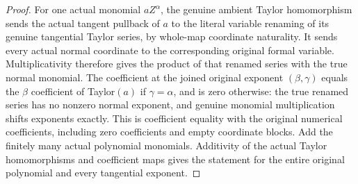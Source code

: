 \begin{proof}
For one actual monomial $a Z^\alpha$, the genuine ambient Taylor
homomorphism sends the actual tangent pullback of $a$ to the literal variable
renaming of its genuine tangential Taylor series, by whole-map coordinate
naturality. It sends every actual normal coordinate to the corresponding
original formal variable. Multiplicativity therefore gives the product of
that renamed series with the true normal monomial. The coefficient at the
joined original exponent $(\beta,\gamma)$ equals the $\beta$ coefficient of
Taylor$(a)$ if $\gamma=\alpha$, and is zero otherwise: the true renamed
series has no nonzero normal exponent, and genuine monomial multiplication
shifts exponents exactly. This is coefficient equality with the original
numerical coefficients, including zero coefficients and empty coordinate
blocks. Add the finitely many actual polynomial monomials. Additivity of
the actual Taylor homomorphisms and coefficient maps gives the statement
for the entire original polynomial and every tangential exponent.
\end{proof}

